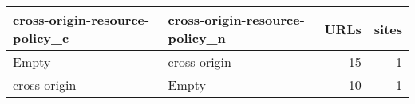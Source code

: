 \begin{tabular}{llrr}
\toprule
cross-origin-resource-policy\_c & cross-origin-resource-policy\_n &  URLs &  sites \\
\midrule
                         Empty &                   cross-origin &    15 &      1 \\
                  cross-origin &                          Empty &    10 &      1 \\
\bottomrule
\end{tabular}
